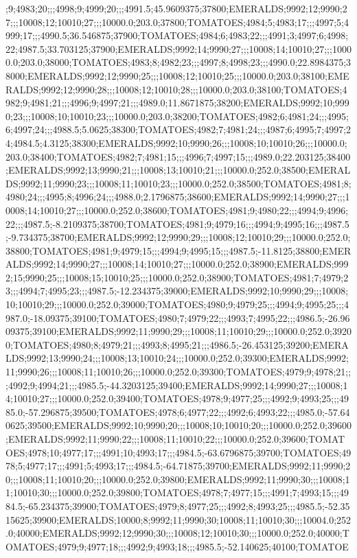 ;9;4983;20;;;4998;9;4999;20;;;4991.5;45.9609375;37800;EMERALDS;9992;12;9990;27;;;10008;12;10010;27;;;10000.0;203.0;37800;TOMATOES;4984;5;4983;17;;;4997;5;4999;17;;;4990.5;36.546875;37900;TOMATOES;4984;6;4983;22;;;4991;3;4997;6;4998;22;4987.5;33.703125;37900;EMERALDS;9992;14;9990;27;;;10008;14;10010;27;;;10000.0;203.0;38000;TOMATOES;4983;8;4982;23;;;4997;8;4998;23;;;4990.0;22.8984375;38000;EMERALDS;9992;12;9990;25;;;10008;12;10010;25;;;10000.0;203.0;38100;EMERALDS;9992;12;9990;28;;;10008;12;10010;28;;;10000.0;203.0;38100;TOMATOES;4982;9;4981;21;;;4996;9;4997;21;;;4989.0;11.8671875;38200;EMERALDS;9992;10;9990;23;;;10008;10;10010;23;;;10000.0;203.0;38200;TOMATOES;4982;6;4981;24;;;4995;6;4997;24;;;4988.5;5.0625;38300;TOMATOES;4982;7;4981;24;;;4987;6;4995;7;4997;24;4984.5;4.3125;38300;EMERALDS;9992;10;9990;26;;;10008;10;10010;26;;;10000.0;203.0;38400;TOMATOES;4982;7;4981;15;;;4996;7;4997;15;;;4989.0;22.203125;38400;EMERALDS;9992;13;9990;21;;;10008;13;10010;21;;;10000.0;252.0;38500;EMERALDS;9992;11;9990;23;;;10008;11;10010;23;;;10000.0;252.0;38500;TOMATOES;4981;8;4980;24;;;4995;8;4996;24;;;4988.0;2.1796875;38600;EMERALDS;9992;14;9990;27;;;10008;14;10010;27;;;10000.0;252.0;38600;TOMATOES;4981;9;4980;22;;;4994;9;4996;22;;;4987.5;-8.2109375;38700;TOMATOES;4981;9;4979;16;;;4994;9;4995;16;;;4987.5;-9.734375;38700;EMERALDS;9992;12;9990;29;;;10008;12;10010;29;;;10000.0;252.0;38800;TOMATOES;4981;9;4979;15;;;4994;9;4995;15;;;4987.5;-11.8125;38800;EMERALDS;9992;14;9990;27;;;10008;14;10010;27;;;10000.0;252.0;38900;EMERALDS;9992;15;9990;25;;;10008;15;10010;25;;;10000.0;252.0;38900;TOMATOES;4981;7;4979;23;;;4994;7;4995;23;;;4987.5;-12.234375;39000;EMERALDS;9992;10;9990;29;;;10008;10;10010;29;;;10000.0;252.0;39000;TOMATOES;4980;9;4979;25;;;4994;9;4995;25;;;4987.0;-18.09375;39100;TOMATOES;4980;7;4979;22;;;4993;7;4995;22;;;4986.5;-26.9609375;39100;EMERALDS;9992;11;9990;29;;;10008;11;10010;29;;;10000.0;252.0;39200;TOMATOES;4980;8;4979;21;;;4993;8;4995;21;;;4986.5;-26.453125;39200;EMERALDS;9992;13;9990;24;;;10008;13;10010;24;;;10000.0;252.0;39300;EMERALDS;9992;11;9990;26;;;10008;11;10010;26;;;10000.0;252.0;39300;TOMATOES;4979;9;4978;21;;;4992;9;4994;21;;;4985.5;-44.3203125;39400;EMERALDS;9992;14;9990;27;;;10008;14;10010;27;;;10000.0;252.0;39400;TOMATOES;4978;9;4977;25;;;4992;9;4993;25;;;4985.0;-57.296875;39500;TOMATOES;4978;6;4977;22;;;4992;6;4993;22;;;4985.0;-57.640625;39500;EMERALDS;9992;10;9990;20;;;10008;10;10010;20;;;10000.0;252.0;39600;EMERALDS;9992;11;9990;22;;;10008;11;10010;22;;;10000.0;252.0;39600;TOMATOES;4978;10;4977;17;;;4991;10;4993;17;;;4984.5;-63.6796875;39700;TOMATOES;4978;5;4977;17;;;4991;5;4993;17;;;4984.5;-64.71875;39700;EMERALDS;9992;11;9990;20;;;10008;11;10010;20;;;10000.0;252.0;39800;EMERALDS;9992;11;9990;30;;;10008;11;10010;30;;;10000.0;252.0;39800;TOMATOES;4978;7;4977;15;;;4991;7;4993;15;;;4984.5;-65.234375;39900;TOMATOES;4979;8;4977;25;;;4992;8;4993;25;;;4985.5;-52.3515625;39900;EMERALDS;10000;8;9992;11;9990;30;10008;11;10010;30;;;10004.0;252.0;40000;EMERALDS;9992;12;9990;30;;;10008;12;10010;30;;;10000.0;252.0;40000;TOMATOES;4979;9;4977;18;;;4992;9;4993;18;;;4985.5;-52.140625;40100;TOMATOE